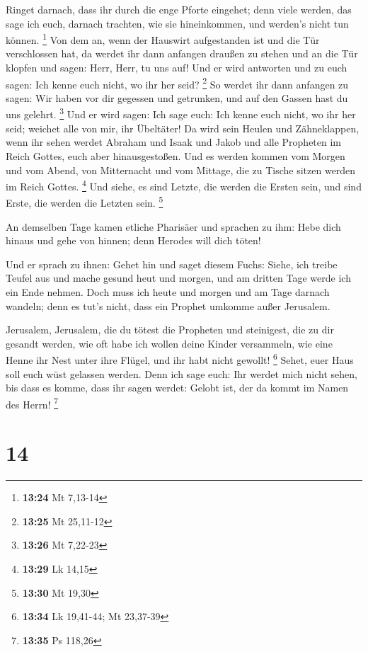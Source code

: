  Ringet darnach, dass ihr durch die enge Pforte eingehet;
denn viele werden, das sage ich euch, darnach trachten, wie sie
hineinkommen, und werden's nicht tun können. \footnote{\textbf{13:24} Mt
  7,13-14}  Von dem an, wenn der Hauswirt aufgestanden ist
und die Tür verschlossen hat, da werdet ihr dann anfangen draußen zu
stehen und an die Tür klopfen und sagen: Herr, Herr, tu uns auf! Und er
wird antworten und zu euch sagen: Ich kenne euch nicht, wo ihr her seid?
\footnote{\textbf{13:25} Mt 25,11-12}  So werdet ihr dann
anfangen zu sagen: Wir haben vor dir gegessen und getrunken, und auf den
Gassen hast du uns gelehrt. \footnote{\textbf{13:26} Mt 7,22-23}
 Und er wird sagen: Ich sage euch: Ich kenne euch nicht, wo
ihr her seid; weichet alle von mir, ihr Übeltäter!  Da wird
sein Heulen und Zähneklappen, wenn ihr sehen werdet Abraham und Isaak
und Jakob und alle Propheten im Reich Gottes, euch aber hinausgestoßen.
 Und es werden kommen vom Morgen und vom Abend, von
Mitternacht und vom Mittage, die zu Tische sitzen werden im Reich
Gottes. \footnote{\textbf{13:29} Lk 14,15}  Und siehe, es
sind Letzte, die werden die Ersten sein, und sind Erste, die werden die
Letzten sein. \footnote{\textbf{13:30} Mt 19,30}

 An demselben Tage kamen etliche Pharisäer und sprachen zu
ihm: Hebe dich hinaus und gehe von hinnen; denn Herodes will dich töten!

 Und er sprach zu ihnen: Gehet hin und saget diesem Fuchs:
Siehe, ich treibe Teufel aus und mache gesund heut und morgen, und am
dritten Tage werde ich ein Ende nehmen.  Doch muss ich
heute und morgen und am Tage darnach wandeln; denn es tut's nicht, dass
ein Prophet umkomme außer Jerusalem.

 Jerusalem, Jerusalem, die du tötest die Propheten und
steinigest, die zu dir gesandt werden, wie oft habe ich wollen deine
Kinder versammeln, wie eine Henne ihr Nest unter ihre Flügel, und ihr
habt nicht gewollt! \footnote{\textbf{13:34} Lk 19,41-44; Mt 23,37-39}
 Sehet, euer Haus soll euch wüst gelassen werden. Denn ich
sage euch: Ihr werdet mich nicht sehen, bis dass es komme, dass ihr
sagen werdet: Gelobt ist, der da kommt im Namen des Herrn! \footnote{\textbf{13:35}
  Ps 118,26}

\hypertarget{section-5}{%
\section{14}\label{section-5}}

